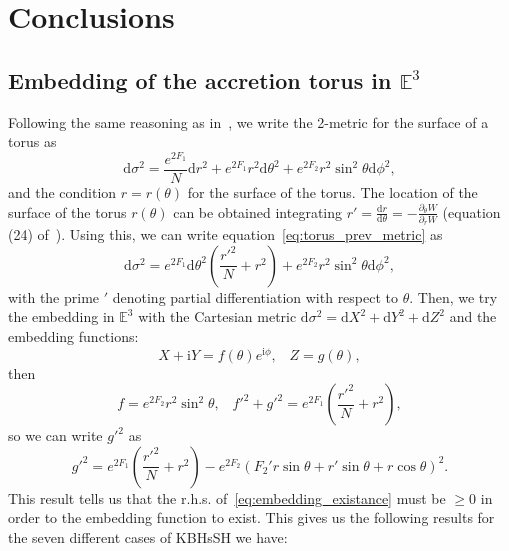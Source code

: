 \documentclass[twocolumn,aps,showpacs,showkeys,prd,superscriptaddress,byrevtex, amsmath]{revtex4-1}
\begin{document}
\section{Conclusions}


\begin{acknowledgements}

\end{acknowledgements}




\begin{appendix}
\section{Embedding of the accretion torus in $\mathbb{E}^3$}\label{torus_embedding}
Following the same reasoning as in~\cite{Delgado:2018}, we write the 2-metric for the surface of a torus as 
\begin{equation}\label{eq:torus_prev_metric}
\mathrm{d}\sigma^2 = \frac{e^{2 F_1}}{N}\mathrm{d}r^2+ e^{2 F_1}r^2\mathrm{d}\theta^2+e^{2 F_2} r^2 \sin^2\theta \mathrm{d}\phi^2,
\end{equation}
and the condition $r = r(\theta)$ for the surface of the torus. The location of the surface of the torus $r(\theta)$ can be obtained integrating $r' = \frac{\mathrm{d}r}{\mathrm{d}\theta} = -\frac{\partial_{\theta}W}{\partial_{r}W}$ (equation (24) of~\citep{Gimeno-Soler:2017}). Using this, we can write equation~\eqref{eq:torus_prev_metric} as
\begin{equation}\label{eq:torus_metric}
\mathrm{d}\sigma^2 = e^{2 F_1} \mathrm{d}\theta^2\left(\frac{r'^2}{N} +r^2\right)+e^{2 F_2} r^2 \sin^2\theta \mathrm{d}\phi^2,
\end{equation}
with the prime $'$ denoting partial differentiation with respect to $\theta$. Then, we try the embedding in $\mathbb{E}^3$ with the Cartesian metric $\mathrm{d}\sigma^2 = \mathrm{d}X^2 + \mathrm{d}Y^2 + \mathrm{d}Z^2$ and the embedding functions:
\begin{equation}
X + \mathrm{i}Y = f(\theta)e^{\mathrm{i}\phi},  \;\;\; Z = g(\theta),
\end{equation}
then
\begin{equation}
f = e^{2 F_2} r^2 \sin^2\theta, \;\;\; f'^2 + g'^2 = e^{2 F_1}\left(\frac{r'^2}{N} +r^2\right),
\end{equation}
so we can write $g'^2$ as
\begin{equation}\label{eq:embedding_existance}
g'^2 = e^{2 F_1}\left(\frac{r'^2}{N} +r^2\right) - e^{2 F_2} (F_2'r \sin \theta + r' \sin \theta + r \cos \theta)^2.
\end{equation}
This result tells us that the r.h.s. of~\eqref{eq:embedding_existance} must be $\geq 0$ in order to the embedding function to exist.
This gives us the following results for the seven different cases of KBHsSH we have:


\end{appendix}
\end{document}
